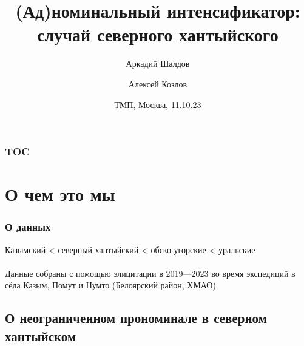 \documentclass{beamer}
\title{(Ад)номинальный интенсификатор: случай северного хантыйского}
\author{Аркадий Шалдов \inst{1} \and Алексей Козлов \inst{1, 2}}
\institute{\inst{1} НИУ ВШЭ, \inst{2} ИЯз РАН}
\date{ТМП, Москва, 11.10.23}
\begin{document}
\newcommand{\colone}[1]{\textcolor{red}{#1}}
\newcommand{\coltwo}[1]{\textcolor{blue}{#1}}



\begin{frame}
    \titlepage
\end{frame}

\begin{frame}
    \frametitle{TOC}
    
    \tableofcontents
    
\end{frame}

\section{О чем это мы}

\begin{frame}
    \frametitle{О данных}
    
    Казымский < северный хантыйский < обско-угорские < уральские\\~\\
    
    Данные собраны с помощью элицитации в 2019—2023 во время экспедиций в сёла Казым, Помут и Нумто (Белоярский район, ХМАО)
    
\end{frame}

\subsection{О неограниченном прономинале в северном хантыйском}
\end{document}
